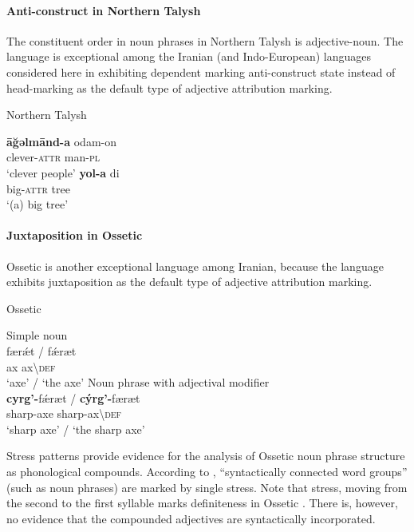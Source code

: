 \paragraph*{Anti\hyp{}construct in Northern Talysh}
\label{talysh synchr}
The constituent order in noun phrases in Northern Talysh is adjective-noun. The language is exceptional among the Iranian (and Indo-European) languages considered here in exhibiting dependent marking anti\hyp{}construct state instead of head-marking  as the default type of adjective attribution marking.
\begin{exe}
\ex \rm{Northern Talysh \citep[27]{schulze2000}}%
\begin{xlist}
\ex
\gll	\textbf{āğəlmānd-a} odam-on\\
	clever-\textsc{attr} man-\textsc{pl}\\
\glt	‘clever people’
\ex
\gll	\textbf{yol-a} di\\
	big-\textsc{attr} tree\\
\glt	‘(a) big tree’
\end{xlist}
\end{exe}

\paragraph*{Juxtaposition in Ossetic}
Ossetic is another exceptional language among Iranian, because the language exhibits juxtaposition as the default type of adjective attribution marking.
\begin{exe}
\ex \rm{Ossetic \citep[12]{abaev1964}}
\label{ossetic attrcomp}
\begin{xlist}
\ex \rm{Simple noun}\\
\gll	færǽt / fǽræt\\
	ax { } ax\textbackslash\textsc{def}\\
\glt	‘axe’ / ‘the axe’
\ex \rm{Noun phrase with adjectival modifier}\\
\gll	\textbf{cyrg'-}fǽræt / \textbf{cýrg'-}færæt\\
	sharp-axe { } sharp-ax\textbackslash\textsc{def}\\
\glt	‘sharp axe’ / ‘the sharp axe’
\end{xlist}
\end{exe}
Stress patterns provide evidence for the analysis of Ossetic noun phrase structure as phonological compounds. According to \citet[10]{abaev1964}, “syntactically connected word groups” (such as noun phrases) are marked by single stress. Note that stress, moving from the second to the first syllable marks definiteness in Ossetic \citep[12]{abaev1964}. There is, however, no evidence that the compounded adjectives are syntactically incorporated.

